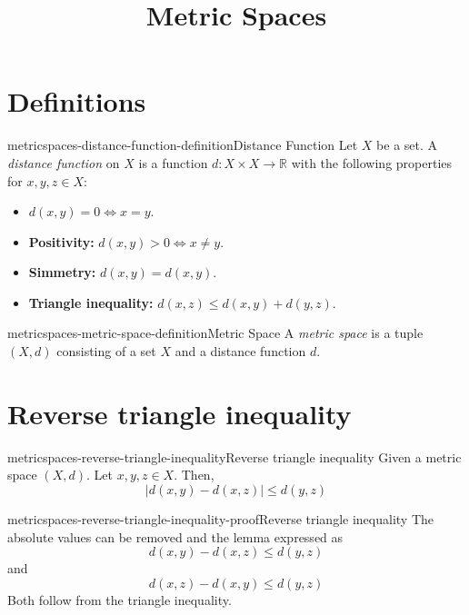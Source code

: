 \documentclass[preview]{standalone}
\begin{document}
\title{Metric Spaces}
\genpage

\section{Definitions}

\begin{snippetdefinition}{metricspaces-distance-function-definition}{Distance Function}
    Let \(X\) be a set.
    A \textit{distance function} on \(X\) is
    a function \(d: X \times X \to \mathbb{R}\)
    with the following properties for \(x,y,z \in X\):
    \begin{itemize}
        \item \(d(x,y) = 0 \iff x = y\).
        \item \textbf{Positivity:} \(d(x,y) > 0 \iff x \neq y\).
        \item \textbf{Simmetry:} \(d(x,y) = d(x,y)\).
        \item \textbf{Triangle inequality:} \(d(x,z) \leq d(x,y) + d(y,z)\).
    \end{itemize}
\end{snippetdefinition}

\begin{snippetdefinition}{metricspaces-metric-space-definition}{Metric Space}
    A \textit{metric space} is a tuple \((X, d)\)
    consisting of a set \(X\) and a distance function \(d\). %
\end{snippetdefinition}

\section{Reverse triangle inequality}

\begin{snippetlemma}{metricspaces-reverse-triangle-inequality}{Reverse triangle inequality}
    Given a metric space \((X,d)\). Let \(x,y,z \in X\).
    Then, \[|d(x,y) - d(x,z)| \leq d(y,z)\]
\end{snippetlemma}

\begin{snippetproof}{metricspaces-reverse-triangle-inequality-proof}{Reverse triangle inequality}
    The absolute values can be removed and the lemma expressed as
    \[
        d(x,y) - d(x,z) \leq d(y,z)
    \]
    and
    \[
        d(x,z) - d(x,y) \leq d(y,z)
    \]
    Both follow from the triangle inequality.
\end{snippetproof}
\end{document}
